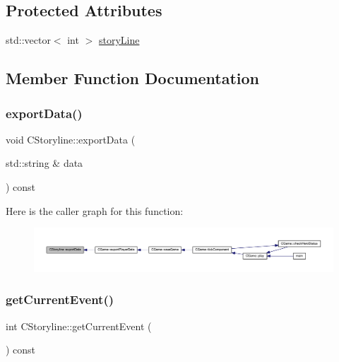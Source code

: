 \subsection*{Protected Attributes}
\begin{DoxyCompactItemize}
\item 
std\+::vector$<$ int $>$ \mbox{\hyperlink{class_c_storyline_aafcf95c5c5983c6e1616f6f547ee5893}{story\+Line}}
\end{DoxyCompactItemize}


\subsection{Member Function Documentation}
\mbox{\label{class_c_storyline_aa8cb69bd93260855dc0221d901b1bd07}} 
\subsubsection{\texorpdfstring{export\+Data()}{exportData()}}
{\footnotesize\ttfamily void C\+Storyline\+::export\+Data (\begin{DoxyParamCaption}\item[{std\+::string \&}]{data }\end{DoxyParamCaption}) const}

Here is the caller graph for this function\+:\nopagebreak
\begin{figure}[H]
\begin{center}
\leavevmode
\includegraphics[width=350pt]{class_c_storyline_aa8cb69bd93260855dc0221d901b1bd07_icgraph}
\end{center}
\end{figure}
\mbox{\label{class_c_storyline_a5de98e457a382194c6bcdcd57dda33c4}} 
\subsubsection{\texorpdfstring{get\+Current\+Event()}{getCurrentEvent()}}
{\footnotesize\ttfamily int C\+Storyline\+::get\+Current\+Event (\begin{DoxyParamCaption}{ }\end{DoxyParamCaption}) const\hspace{0.3cm}{\ttfamily [inline]}}

